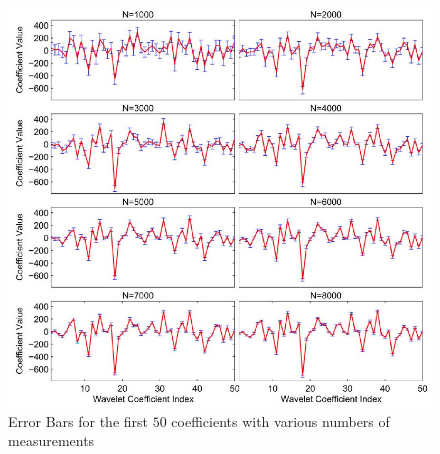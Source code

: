 \documentclass{IEEEtran}
\begin{document}
\begin{figure}[ht]
  \centering
  \includegraphics[width=1\linewidth]{he_carin_errorbars}
  \caption{Error Bars for the first $50$ coefficients with various
    numbers of measurements}
  \label{wave4}
\end{figure}
\end{document}
